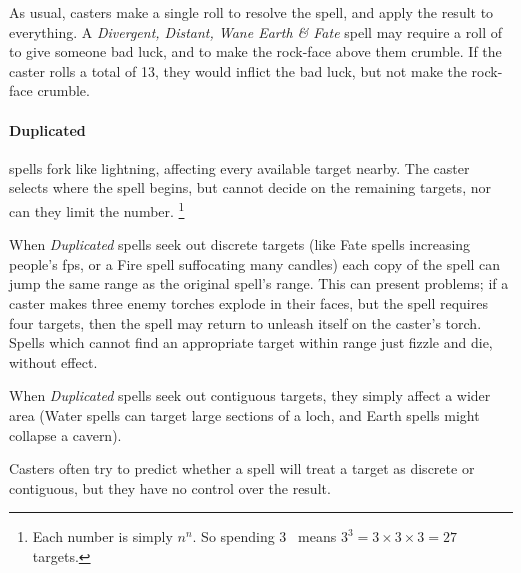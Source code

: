 \begin{multicols}{2}
As usual, casters make a single roll to resolve the spell, and apply the result to everything.
A \textit{Divergent, Distant, Wane Earth \& Fate} spell may require a roll of \tn[7] to give someone bad luck, and \tn[14] to make the rock-face above them crumble.
If the caster rolls a total of 13, they would inflict the bad luck, but not make the rock-face crumble.

\paragraph{Duplicated}
\label{duplicatedDesc}
spells fork like lightning, affecting every available target nearby.
The caster selects where the spell begins, but cannot decide on the remaining targets, nor can they limit the number.%
\footnote{Each number is simply $n^n$.  So spending 3~ means $3^3 = 3\times 3\times 3 = 27$ targets.}


When \textit{Duplicated} spells seek out discrete targets (like Fate spells increasing people's \glspl{fp}, or a Fire spell suffocating many candles) each copy of the spell can jump the same range as the original spell's range.
This can present problems; if a caster makes three enemy torches explode in their faces, but the spell requires four targets, then the spell may return to unleash itself on the caster's torch.
Spells which cannot find an appropriate target within range just fizzle and die, without effect.

When \textit{Duplicated} spells seek out contiguous targets, they simply affect a wider area
(Water spells can target large sections of a loch, and Earth spells might collapse a cavern).

Casters often try to predict whether a spell will treat a target as discrete or contiguous, but they have no control over the result.


\end{multicols}
